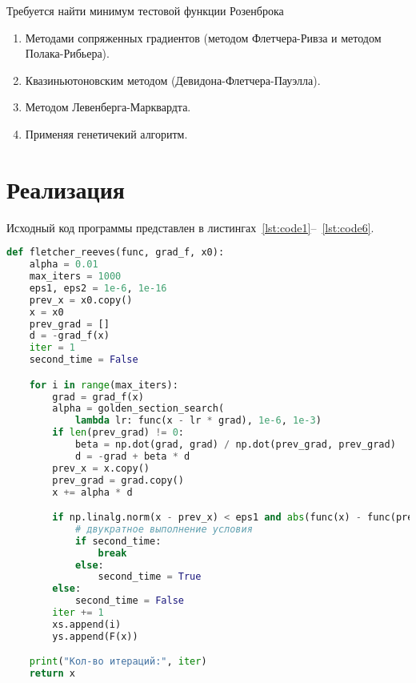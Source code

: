 \documentclass[a4paper, 14pt]{extarticle}
\begin{document}
Требуется найти минимум тестовой функции Розенброка
\begin{enumerate}
\item Методами сопряженных градиентов (методом Флетчера-Ривза и методом Полака-Рибьера).
\item Квазиньютоновским методом (Девидона-Флетчера-Пауэлла).
\item Методом Левенберга-Марквардта.
\item Применяя генетичекий алгоритм.
\end{enumerate}

\section{Реализация}\label{Sect::realize}

Исходный код программы представлен в листингах~\ref{lst:code1}--~\ref{lst:code6}.

\begin{lstlisting}[language=Python,caption={Метод Флетчера-Ривза},label={lst:code1}]
def fletcher_reeves(func, grad_f, x0):
    alpha = 0.01
    max_iters = 1000
    eps1, eps2 = 1e-6, 1e-16
    prev_x = x0.copy()
    x = x0
    prev_grad = []
    d = -grad_f(x)
    iter = 1
    second_time = False

    for i in range(max_iters):
        grad = grad_f(x)
        alpha = golden_section_search(
            lambda lr: func(x - lr * grad), 1e-6, 1e-3)
        if len(prev_grad) != 0:
            beta = np.dot(grad, grad) / np.dot(prev_grad, prev_grad)
            d = -grad + beta * d
        prev_x = x.copy()
        prev_grad = grad.copy()
        x += alpha * d

        if np.linalg.norm(x - prev_x) < eps1 and abs(func(x) - func(prev_x)) < eps2:
            # двукратное выполнение условия
            if second_time:
                break
            else:
                second_time = True
        else:
            second_time = False
        iter += 1
        xs.append(i)
        ys.append(F(x))

    print("Кол-во итераций:", iter)
    return x
\end{lstlisting}
\end{document}
